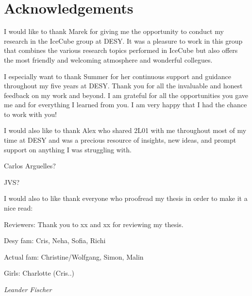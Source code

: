 \chapter*{Acknowledgements}
I would like to thank Marek for giving me the opportunity to conduct my research in the IceCube group at DESY. It was a pleasure to work in this group that combines the various research topics performed in IceCube but also offers the most friendly and welcoming atmosphere and wonderful collegues.

I especially want to thank Summer for her continuous support and guidance throughout my five years at DESY. Thank you for all the invaluable and honest feedback on my work and beyond. I am grateful for all the opportunities you gave me and for everything I learned from you. I am very happy that I had the chance to work with you!

I would also like to thank Alex who shared 2L01 with me throughout most of my time at DESY and was a precious resource of insights, new ideas, and prompt support on anything I was struggling with.

Carlos Arguelles?

JVS?

I would also to like thank everyone who proofread my thesis in order to make it a nice read: 


Reviewers:
Thank you to xx and xx for reviewing my thesis.


Desy fam:
Cris, Neha, Sofia, Richi


Actual fam:
Christine/Wolfgang, Simon, Malin

Girls:
Charlotte (Cris..)


\begin{flushright}
	\textit{Leander Fischer}
\end{flushright}